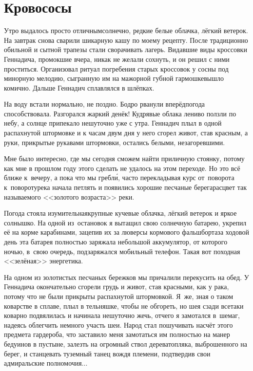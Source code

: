 \chapter{Кровососы} 
\vepsianrose

Утро выдалось просто отличным\mdash  солнечно, редкие белые облачка, лёгкий ветерок. На завтрак снова сварили шикарную кашу по моему рецепту. После традиционно обильной и сытной трапезы стали сворачивать лагерь. Видавшие виды кроссовки Геннадича, промокшие вчера, никак не желали сохнуть, и он решил с ними проститься. Организовал ритуал погребения старых кроссовок у сосны под минорную мелодию, сыгранную им на мажорной губной гармошке\mdash вышло комично. Дальше Геннадич сплавлялся в шлёпках. 

На воду встали нормально, не поздно.  Бодро рванули вперёд\mdash погода способствовала. Разгорался жаркий денёк! Кудрявые облака лениво ползли по небу, а солнце припекало нешуточно уже с утра. Геннадич плыл в одной распахнутой штормовке и к часам двум дня у него сгорел живот, став красным, а руки, прикрытые рукавами штормовки, остались белыми, незагоревшими.

\newpage
Мне было интересно, где мы сегодня сможем найти приличную стоянку, потому как мне в прошлом году этого сделать не удалось на этом переходе. Но это всё ближе к~вечеру, а пока что мы гребл\'{и}, часто перекладывая курс от~поворота к~повороту\mdash  река начала петлять и появились хорошие песчаные берега\mdash  расцвет так называемого <<золотого возраста>> реки.

Погода стояла изумительная\mdash крупные кучевые облачка, лёгкий ветерок и яркое солнышко. На одной из~остановок я вытащил свою солнечную батарею, укрепил её на корме карабинами, зацепив их за люверсы кормового фальшборта\mdash за ходовой день эта батарея полностью заряжала небольшой аккумулятор, от которого ночью, в~свою очередь, подзаряжался мобильный телефон. Такая вот походная <<зелёная>> энергетика.

На одном из золотистых песчаных бережков мы причалили перекусить на обед. У Геннадича окончательно сгорели грудь и живот, став красными, как у рака, потому что не были прикрыты распахнутой штормовкой. Я~же, зная о таком коварстве в сплаве, плыл в тельняшке, чтобы не обгореть, но шея сзади все\sdash таки коварно подвялилась и начинала нешуточно жечь, отчего я замотался в~шемаг, надеясь облегчить немного участь шеи. Народ стал пошучивать насчёт этого предмета гардероба, что заставило меня замотаться им полностью на манер бедуинов в пустыне, залезть на огромный ствол дерева\sdash топляка, выброшенного на берег, и станцевать туземный танец вождя племени, подтвердив свои адмиральские полномочия$\ldots$

